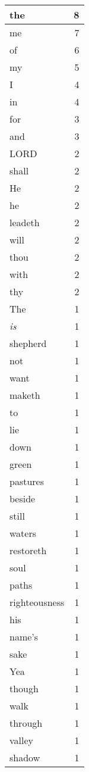 \begin{center}
\begin{longtable}{l|r}
\hline \hline
\endlastfoot
the & 8 \\ \hline
me & 7 \\ \hline
of & 6 \\ \hline
my & 5 \\ \hline
I & 4 \\ \hline
in & 4 \\ \hline
for & 3 \\ \hline
and & 3 \\ \hline
LORD & 2 \\ \hline
shall & 2 \\ \hline
He & 2 \\ \hline
he & 2 \\ \hline
leadeth & 2 \\ \hline
will & 2 \\ \hline
thou & 2 \\ \hline
with & 2 \\ \hline
thy & 2 \\ \hline
The & 1 \\ \hline
\emph{is} & 1 \\ \hline
shepherd & 1 \\ \hline
not & 1 \\ \hline
want & 1 \\ \hline
maketh & 1 \\ \hline
to & 1 \\ \hline
lie & 1 \\ \hline
down & 1 \\ \hline
green & 1 \\ \hline
pastures & 1 \\ \hline
beside & 1 \\ \hline
still & 1 \\ \hline
waters & 1 \\ \hline
restoreth & 1 \\ \hline
soul & 1 \\ \hline
paths & 1 \\ \hline
righteousness & 1 \\ \hline
his & 1 \\ \hline
name's & 1 \\ \hline
sake & 1 \\ \hline
Yea & 1 \\ \hline
though & 1 \\ \hline
walk & 1 \\ \hline
through & 1 \\ \hline
valley & 1 \\ \hline
shadow & 1 \\ \hline

\end{longtable}
\end{center}
